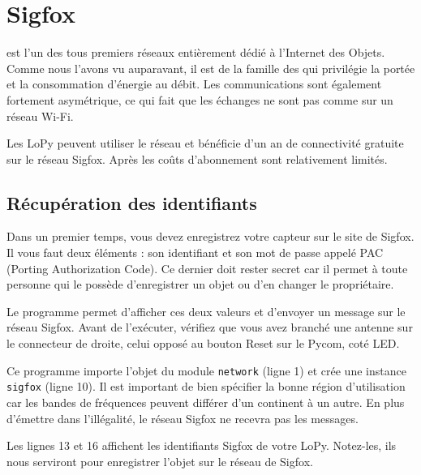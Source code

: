 \cleardoublepage

\chapter{Sigfox}

\begin{figure}
\end{figure}


 est l'un des tous premiers réseaux entièrement dédié à l'Internet des Objets. Comme nous l'avons vu auparavant, il est de la famille des  qui privilégie la portée et la consommation d'énergie au débit. Les communications sont également fortement asymétrique, ce qui fait que les échanges ne sont pas comme sur un réseau Wi-Fi. 

     \vspace{1em}

Les LoPy peuvent utiliser le réseau et bénéficie d'un an de connectivité gratuite sur le réseau Sigfox. Après les coûts d'abonnement sont relativement limités.

\section{Récupération des identifiants}

Dans un premier temps, vous devez enregistrez votre capteur sur le site de Sigfox. Il vous faut deux éléments : son identifiant et son mot de passe appelé PAC (Porting Authorization Code). Ce dernier doit rester secret car il permet à toute personne qui le possède d’enregistrer un objet ou d’en changer le propriétaire.

Le programme  permet d’afficher ces deux valeurs et d’envoyer un message sur le réseau Sigfox. 
Avant de l’exécuter, vérifiez que vous avez branché une antenne sur le connecteur de droite, celui opposé au bouton Reset sur le Pycom, coté LED.


Ce programme importe l’objet  du module \texttt{network} (ligne 1) et crée une instance \texttt{sigfox} (ligne 10). Il est important de bien spécifier la bonne région d’utilisation car les bandes de fréquences peuvent différer d'un continent à un autre. En plus d’émettre dans l’illégalité, le réseau Sigfox ne recevra pas les messages.

Les lignes 13 et 16 affichent les identifiants Sigfox de votre LoPy. Notez-les, ils nous serviront pour enregistrer l’objet sur le réseau de Sigfox.


